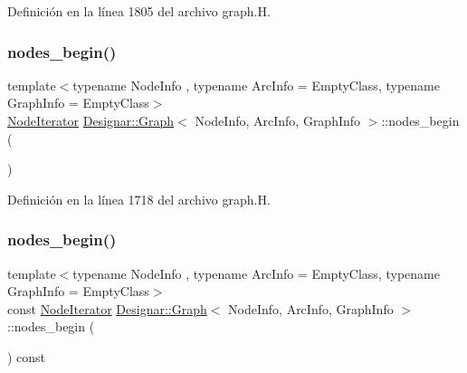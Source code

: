 Definición en la línea 1805 del archivo graph.\+H.

\mbox{\label{class_designar_1_1_graph_a4f492f9b89d1d647e53171d7bb4d4acd}} 
\subsubsection{\texorpdfstring{nodes\+\_\+begin()}{nodes\_begin()}\hspace{0.1cm}{\footnotesize\ttfamily [1/2]}}
{\footnotesize\ttfamily template$<$typename Node\+Info , typename Arc\+Info  = Empty\+Class, typename Graph\+Info  = Empty\+Class$>$ \\
\hyperlink{class_designar_1_1_graph_1_1_node_iterator}{Node\+Iterator} \hyperlink{class_designar_1_1_graph}{Designar\+::\+Graph}$<$ Node\+Info, Arc\+Info, Graph\+Info $>$\+::nodes\+\_\+begin (\begin{DoxyParamCaption}{ }\end{DoxyParamCaption})\hspace{0.3cm}{\ttfamily [inline]}}



Definición en la línea 1718 del archivo graph.\+H.

\mbox{\label{class_designar_1_1_graph_acd4d942eba98e1eb138b9566f1d9bb75}} 
\subsubsection{\texorpdfstring{nodes\+\_\+begin()}{nodes\_begin()}\hspace{0.1cm}{\footnotesize\ttfamily [2/2]}}
{\footnotesize\ttfamily template$<$typename Node\+Info , typename Arc\+Info  = Empty\+Class, typename Graph\+Info  = Empty\+Class$>$ \\
const \hyperlink{class_designar_1_1_graph_1_1_node_iterator}{Node\+Iterator} \hyperlink{class_designar_1_1_graph}{Designar\+::\+Graph}$<$ Node\+Info, Arc\+Info, Graph\+Info $>$\+::nodes\+\_\+begin (\begin{DoxyParamCaption}{ }\end{DoxyParamCaption}) const\hspace{0.3cm}{\ttfamily [inline]}}



